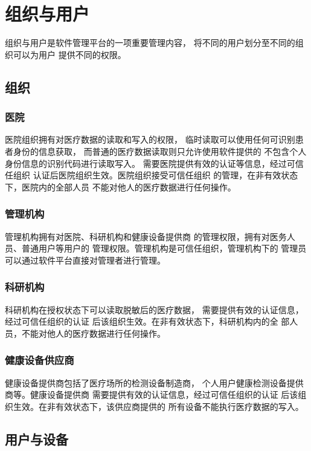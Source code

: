 \documentclass[UTF8]{ctexart}
\begin{document}
    \section{组织与用户}
    \par
    组织与用户是软件管理平台的一项重要管理内容，
    将不同的用户划分至不同的组织可以为用户
    提供不同的权限。
    \subsection{组织}
    \subsubsection{医院}
    \par
    医院组织拥有对医疗数据的读取和写入的权限，
    临时读取可以使用任何可识别患者身份的信息获取，
    而普通的医疗数据读取则只允许使用软件提供的
    不包含个人身份信息的识别代码进行读取写入。
    需要医院提供有效的认证等信息，经过可信任组织
    认证后医院组织生效。医院组织接受可信任组织
    的管理，在非有效状态下，医院内的全部人员
    不能对他人的医疗数据进行任何操作。
    \subsubsection{管理机构}
    \par
    管理机构拥有对医院、科研机构和健康设备提供商
    的管理权限，拥有对医务人员、普通用户等用户的
    管理权限。管理机构是可信任组织，管理机构下的
    管理员可以通过软件平台直接对管理者进行管理。
    \subsubsection{科研机构}
    \par
    科研机构在授权状态下可以读取脱敏后的医疗数据，
    需要提供有效的认证信息，经过可信任组织的认证
    后该组织生效。在非有效状态下，科研机构内的全
    部人员，不能对他人的医疗数据进行任何操作。
    \subsubsection{健康设备供应商}
    \par
    健康设备提供商包括了医疗场所的检测设备制造商，
    个人用户健康检测设备提供商等。健康设备提供商
    需要提供有效的认证信息，经过可信任组织的认证
    后该组织生效。在非有效状态下，该供应商提供的
    所有设备不能执行医疗数据的写入。
    \subsection{用户与设备}
\end{document}
